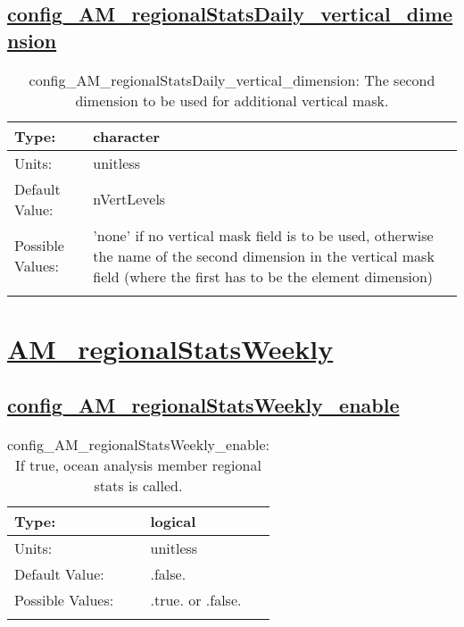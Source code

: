 \subsection[config\_AM\_regionalStatsDaily\_vertical\_dimension]{\hyperref[sec:nm_tab_AM_regionalStatsDaily]{config\_AM\_regionalStatsDaily\_vertical\_dimension}}
\label{subsec:nm_sec_config_AM_regionalStatsDaily_vertical_dimension}
\begin{center}
\begin{longtable}{| p{2.0in} || p{4.0in} |}
    \hline
    Type: & character \\
    \hline
    Units: & \si{unitless} \\
    \hline
    Default Value: & nVertLevels \\
    \hline
    Possible Values: & 'none' if no vertical mask field is to be used, otherwise the name of the second dimension in the vertical mask field (where the first has to be the element dimension) \\
    \hline
    \caption{config\_AM\_regionalStatsDaily\_vertical\_dimension: The second dimension to be used for additional vertical mask.}
\end{longtable}
\end{center}
\section[AM\_regionalStatsWeekly]{\hyperref[sec:nm_tab_AM_regionalStatsWeekly]{AM\_regionalStatsWeekly}}
\label{sec:nm_sec_AM_regionalStatsWeekly}
\subsection[config\_AM\_regionalStatsWeekly\_enable]{\hyperref[sec:nm_tab_AM_regionalStatsWeekly]{config\_AM\_regionalStatsWeekly\_enable}}
\label{subsec:nm_sec_config_AM_regionalStatsWeekly_enable}
\begin{center}
\begin{longtable}{| p{2.0in} || p{4.0in} |}
    \hline
    Type: & logical \\
    \hline
    Units: & \si{unitless} \\
    \hline
    Default Value: & .false. \\
    \hline
    Possible Values: & .true. or .false. \\
    \hline
    \caption{config\_AM\_regionalStatsWeekly\_enable: If true, ocean analysis member regional stats is called.}
\end{longtable}
\end{center}
